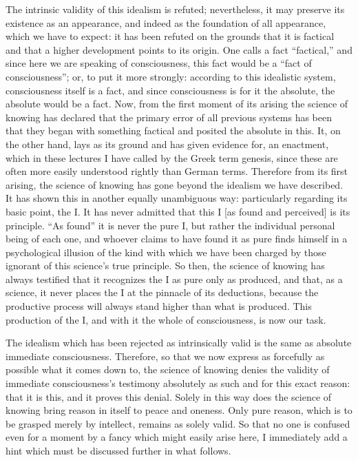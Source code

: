 The intrinsic validity of this idealism is refuted;
nevertheless, it may preserve its existence as an appearance,
and indeed as the foundation of all appearance,
which we have to expect:
it has been refuted on the grounds that it is factical
and that a higher development points to its origin.
One calls a fact “factical,”
and since here we are speaking of consciousness,
this fact would be a “fact of consciousness”;
or, to put it more strongly:
according to this idealistic system,
consciousness itself is a fact,
and since consciousness is for it the absolute,
the absolute would be a fact.
Now, from the first moment of its arising
the science of knowing has declared that the
primary error of all previous systems has been
that they began with something factical
and posited the absolute in this.
It, on the other hand, lays as its ground
and has given evidence for, an enactment,
which in these lectures I have called by the Greek term genesis,
since these are often more easily understood rightly than German terms.
Therefore from its first arising,
the science of knowing has gone beyond the idealism we have described.
It has shown this in another equally unambiguous way:
particularly regarding its basic point, the I.
It has never admitted that this I
[as found and perceived]
is its principle.
“As found” it is never the pure I,
but rather the individual personal being of each one,
and whoever claims to have found it as pure finds himself
in a psychological illusion of the kind
with which we have been charged by those
ignorant of this science’s true principle.
So then, the science of knowing has always testified
that it recognizes the I as pure only as produced,
and that, as a science, it never places the I
at the pinnacle of its deductions,
because the productive process will always stand
higher than what is produced.
This production of the I,
and with it the whole of consciousness,
is now our task.

The idealism which has been rejected as intrinsically valid is
the same as absolute immediate consciousness.
Therefore, so that we now express
as forcefully as possible what it comes down to,
the science of knowing denies the validity of
immediate consciousness’s testimony absolutely
as such and for this exact reason:
that it is this, and it proves this denial.
Solely in this way does the science of knowing
bring reason in itself to peace and oneness.
Only pure reason, which is to be grasped merely by intellect,
remains as solely valid.
So that no one is confused even for a moment
by a fancy which might easily arise here,
I immediately add a hint which must be discussed
further in what follows.

